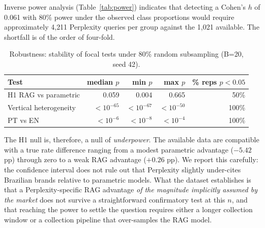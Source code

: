 \documentclass[preprint,12pt,authoryear]{elsarticle}
\begin{document}
Inverse power analysis (Table~\ref{tab:power}) indicates that detecting a Cohen's $h$ of 0.061 with 80\% power under the observed class proportions would require approximately 4{,}211 Perplexity queries per group against the 1{,}021 available. The shortfall is of the order of four-fold.

\begin{table}[htbp]
\centering
\small
\caption{Inverse power analysis ($\alpha=0.05$, power $=0.80$).}
\label{tab:power}
\end{table}

\begin{table}[htbp]
\centering
\small
\caption{Robustness: stability of focal tests under 80\% random subsampling (B=20, seed 42).}
\label{tab:stability}
\begin{tabular}{@{}l r r r r@{}}
\toprule
\textbf{Test} & median $p$ & min $p$ & max $p$ & \% reps $p<0.05$ \\
\midrule
H1 RAG vs parametric & 0.059 & 0.004 & 0.665 & 50\% \\
Vertical heterogeneity & $<10^{-65}$ & $<10^{-67}$ & $<10^{-50}$ & 100\% \\
PT vs EN & $<10^{-6}$ & $<10^{-8}$ & $<10^{-4}$ & 100\% \\
\bottomrule
\end{tabular}
\end{table}

The H1 null is, therefore, a null of \emph{underpower}. The available data are compatible with a true rate difference ranging from a modest parametric advantage ($-5.42$ pp) through zero to a weak RAG advantage ($+0.26$ pp). We report this carefully: the confidence interval does not rule out that Perplexity slightly under-cites Brazilian brands relative to parametric models. What the dataset establishes is that a Perplexity-specific RAG advantage \emph{of the magnitude implicitly assumed by the market} does not survive a straightforward confirmatory test at this $n$, and that reaching the power to settle the question requires either a longer collection window or a collection pipeline that over-samples the RAG model.
\end{document}
